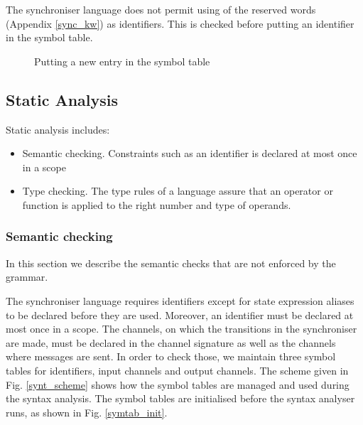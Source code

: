 The synchroniser language does not permit using of the reserved words (Appendix \ref{sync_kw}) as identifiers. This is checked before putting an identifier in the symbol table.

\begin{figure}%
\noindent{}
\caption{Putting a new entry in the symbol table\label{symtab_put}}
\end{figure}






\subsection{Static Analysis}
Static analysis includes:
\begin{itemize}
\item Semantic checking. Constraints such as an identifier is declared at most once in a scope
\item Type checking. The type rules of a language assure that an operator or function is applied to the right number and type of operands.
\end{itemize}

  \subsubsection{Semantic checking}
In this section we describe the semantic checks that are not enforced by the grammar.

The synchroniser language requires identifiers except for state expression aliases to be declared before they are used. Moreover, an identifier must be declared at most once in a scope. The channels, on which the transitions in the synchroniser are made, must be declared in the channel signature as well as the channels where messages are sent. In order to check those, we maintain three symbol tables for identifiers, input channels and output channels. The scheme given in Fig. \ref{synt_scheme} shows how the symbol tables are managed and used during the syntax analysis. The symbol tables are initialised before the syntax analyser runs, as shown in Fig. \ref{symtab_init}.

